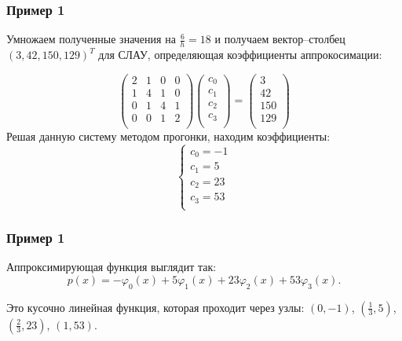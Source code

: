 \documentclass[10pt]{beamer}
\begin{document}
\begin{frame}[fragile]
\frametitle{Пример 1}
Умножаем полученные значения на $\frac{6}{h} = 18$ и получаем вектор--столбец $(3, 42, 150, 129)^T$ для СЛАУ, определяющая коэффициенты аппрокосимации:

$$
\begin{pmatrix}
2 & 1 & 0 & 0 \\
1 & 4 & 1 & 0 \\
0 & 1 & 4 & 1 \\
0 & 0 & 1 & 2\\
\end{pmatrix}
\begin{pmatrix}
c_0 \\
c_1 \\
c_2 \\
c_3 \\
\end{pmatrix}
=
\begin{pmatrix}
3\\
42\\
150\\
129\\
\end{pmatrix}
$$
Решая данную систему методом прогонки, находим коэффициенты:
$$
\begin{cases}
c_0 = -1 \\
c_1 = 5 \\
c_2 = 23 \\
c_3 = 53 \\
\end{cases}
$$
\end{frame}

\begin{frame}[fragile]
\frametitle{Пример 1}
Аппроксимирующая функция выглядит так:
$$
p(x) = -\varphi_0(x) + 5 \varphi_1(x) + 23 \varphi_2(x) + 53 \varphi_3(x).
$$

Это кусочно линейная функция, которая проходит через узлы: $(0, -1)$, $\left(\frac{1}{3}, 5 \right)$, $\left( \frac{2}{3}, 23 \right)$, $(1, 53)$.
\begin{center}
\end{center}

\end{frame}
\end{document}
